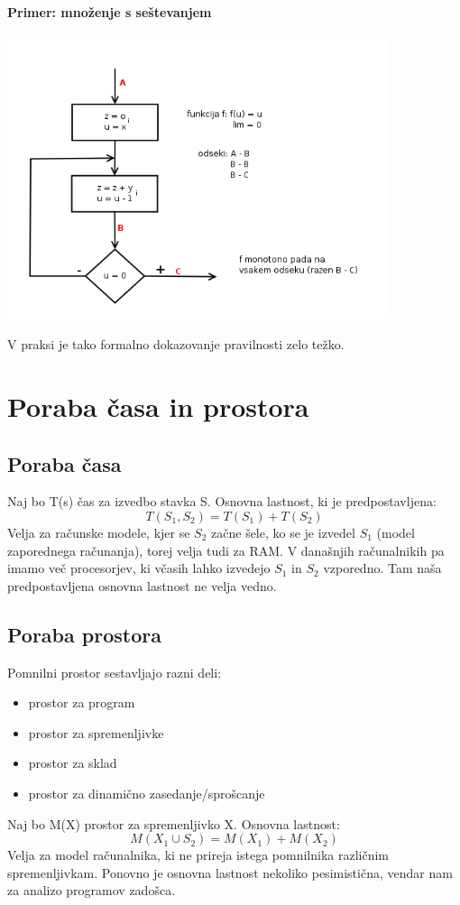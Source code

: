 \documentclass[a4paper,10pt]{article}
\begin{document}
\paragraph{Primer: mno\v zenje s se\v stevanjem}
	\begin{center}
	\includegraphics[width=11.2cm,height=8.25cm]{Slike/DokazovanjePravilnostiZDiagramom.png}
	\end{center}
V praksi je tako formalno dokazovanje pravilnosti zelo te\v zko.

\section{Poraba \v casa in prostora}

\subsection{Poraba \v casa}

Naj bo T(s) \v cas za izvedbo stavka S. Osnovna lastnost, ki je predpostavljena:
$$T(S_1,S_2) = T(S_1) + T(S_2)$$
Velja za ra\v cunske modele, kjer se $S_2$ za\v cne \v sele, ko se je izvedel $S_1$ (model zaporednega ra\v cunanja), torej velja tudi za RAM. V dana\v snjih ra\v cunalnikih pa imamo ve\v c procesorjev, ki v\v casih lahko izvedejo $S_1$ in $S_2$ vzporedno. Tam na\v sa predpostavljena osnovna lastnost ne velja vedno.

\subsection{Poraba prostora}

Pomnilni prostor sestavljajo razni deli:
\begin{itemize}
\item prostor za program
\item prostor za spremenljivke
\item prostor za sklad
\item prostor za dinami\v cno zasedanje/spro\v scanje
\end{itemize}
Naj bo M(X) prostor za spremenljivko X. Osnovna lastnost:
$$M(X_1 \cup S_2) = M(X_1) + M(X_2)$$
Velja za model ra\v cunalnika, ki ne prireja istega pomnilnika razli\v cnim spremenljivkam. Ponovno je osnovna lastnost nekoliko pesimisti\v cna, vendar nam za analizo programov zado\v sca.
\end{document}
